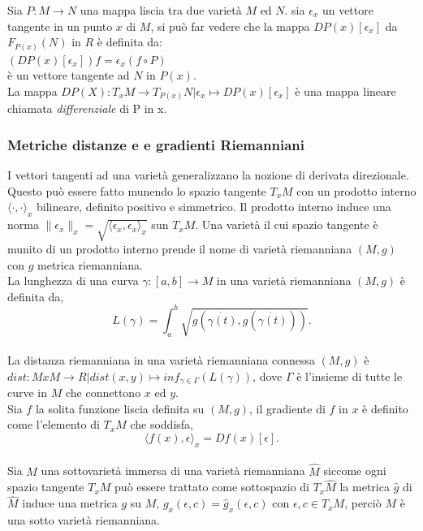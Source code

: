 \documentclass[a4paper, 12pt]{article}
\begin{document}
Sia $P:M \to N$ una mappa liscia tra due varietà $M$ ed $N$. sia $\epsilon_x$ un vettore tangente in un punto $x$ di $M$, si può far vedere che la mappa $DP(x)[\epsilon_x]$ da $F_{P(x)}(N)$ in $R$ è definita da:\\
$(DP(x)[\epsilon_x])f = \epsilon_x(f \circ P)$\\
è un vettore tangente ad $N$ in $P(x)$.\\
La mappa $DP(X) : T_xM \to T_{P(x)}N | \epsilon_x \mapsto DP(x)[\epsilon_x]$ è una mappa lineare chiamata \emph{differenziale} di P in x.
\subsubsection{Metriche distanze e e gradienti Riemanniani}
I vettori tangenti ad una varietà generalizzano la nozione di derivata direzionale. Questo può essere fatto munendo lo spazio tangente $T_xM$ con un prodotto interno $\langle \cdot, \cdot \rangle_x$ bilineare, definito positivo e simmetrico. Il prodotto interno induce una norma $\parallel \epsilon_x \parallel_x = \sqrt{\langle \epsilon_x, \epsilon_x \rangle_x}$ sun $T_xM$. Una varietà il cui spazio tangente è munito di un prodotto interno prende il nome di varietà riemanniana $(M, g)$ con $g$ metrica riemanniana.\\
La lunghezza di una curva $\gamma:[a,b] \to M$ in una varietà riemanniana $(M, g)$ è definita da,\\
\[L(\gamma) = \int_a^b \sqrt{g(\dot{\gamma (t)}, g(\dot{\gamma (t)}))}.\]\\
La distanza riemanniana in una varietà riemanniana connessa $(M,g)$ è $dist: MxM \to R | dist(x,y) \mapsto inf_{\gamma \in \Gamma}(L(\gamma))$, dove $\Gamma$ è l'insieme di tutte le curve in $M$ che connettono $x$ ed $y$.\\
Sia $f$ la solita funzione liscia definita su $(M,g)$, il gradiente di $f$ in $x$ è definito come l'elemento di $T_xM$ che soddisfa,\\
\[\langle f(x), \epsilon \rangle_x = Df(x)[\epsilon].\]\\
Sia $M$ una sottovarietà immersa di una varietà riemanniana $\hat{M}$ siccome ogni spazio tangente $T_xM$ può essere trattato come sottospazio di $T_x\hat{M}$ la metrica $\hat{g}$ di $\hat{M}$ induce una metrica $g$ su $M$, $g_x(\epsilon, c) = \hat{g}_x(\epsilon, c)$ con $\epsilon, c \in T_xM$, perciò $M$ è una sotto varietà riemanniana.
\end{document}
